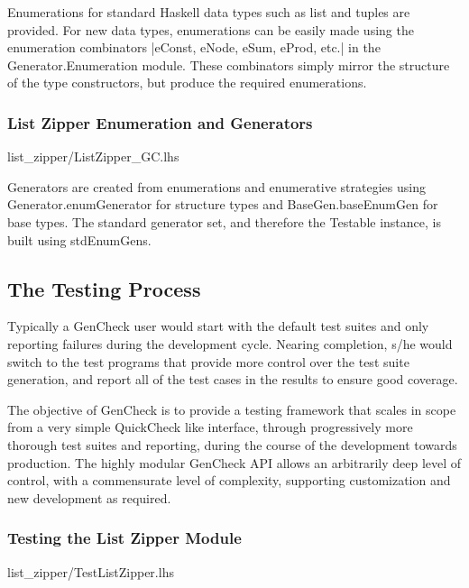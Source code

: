Enumerations for standard Haskell data types such as list and tuples are provided.
For new data types, enumerations can be easily made using the enumeration combinators 
|eConst, eNode, eSum, eProd, etc.| in the Generator.Enumeration module.
These combinators simply mirror the structure of the type constructors,
but produce the required enumerations.

\subsubsection{List Zipper Enumeration and Generators}

 {list_zipper/ListZipper_GC.lhs}

Generators are created from enumerations and enumerative strategies
using Generator.enumGenerator for structure types and BaseGen.baseEnumGen for base types.
The standard generator set, and therefore the Testable instance, is built using stdEnumGens.

\subsection{The Testing Process}
Typically a GenCheck user would start with the default test suites
and only reporting failures during the development cycle.
Nearing completion, s/he would switch to the test programs 
that provide more control over the test suite generation,
and report all of the test cases in the results to ensure good coverage.

The objective of GenCheck is to provide a testing framework that
scales in scope from a very simple QuickCheck like interface,
through progressively more thorough test suites and reporting,
during the course of the development towards production.
The highly modular GenCheck API allows an arbitrarily deep level of control,
with a commensurate level of complexity,
supporting customization and new development as required.

\subsubsection{Testing the List Zipper Module}
 {list_zipper/TestListZipper.lhs}




